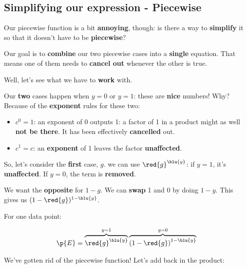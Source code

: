     \subsection{Simplifying our expression - Piecewise}
        
        Our piecewise function is a bit \textbf{annoying}, though: is there a way to \textbf{simplify} it so that it doesn't have to be \textbf{piecewise}?
        
        Our goal is to \textbf{combine} our two piecewise cases into a \textbf{single} equation. That means one of them needs to \textbf{cancel out} whenever the other is true.
        
        Well, let's see what we have to \textbf{work} with.
        
        Our \textbf{two} cases happen when $y=0$ or $y=1$: these are \textbf{nice} numbers! Why? Because of the \textbf{exponent} rules for these two:
        
        \begin{itemize}
            \item $c^0=1$: an exponent of 0 outputs 1: a factor of 1 in a product might as well \textbf{not be there}. It has been effectively \textbf{cancelled} out.
            
            \item $c^1=c$: an \textbf{exponent} of 1 leaves the factor \textbf{unaffected}.
        \end{itemize}
        
        So, let's consider the \textbf{first} case, $g$. we can use $\red{g}^{ \blu{y} }$: if $y=1$, it's \textbf{unaffected}. If $y=0$, the term is \textbf{removed}.
        
        We want the \textbf{opposite} for $1-g$. We can \textbf{swap} 1 and 0 by doing $1-y$. This gives us $(1-\red{g})^{ 1-\blu{y} }$.
        
        For one data point:
        
        \begin{equation}
            \p{E} = 
            \overbrace{
                \red{g} ^ { \blu{y} } 
            }^{y=1}
            \overbrace{
                \left( 
                    1-\red{g} 
                \right) 
                ^ { 1-\blu{y} }
            }^{y=0}
        \end{equation}
        
        We've gotten rid of the piecewise function! Let's add back in the product:
        

